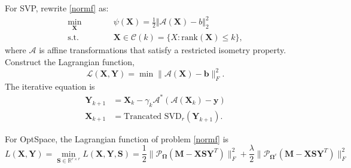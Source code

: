 \documentclass{article}
\begin{document}
{For SVP, rewrite \eqref{normf} as:
\begin{equation}
    \begin{aligned}
        \min_{\mathbf X}\qquad&\quad \psi (\mathbf X) = \frac{1}{2}\Vert \mathcal{A}(\mathbf X) - b\Vert_2^2\\
        \text{s.t.}\qquad&\quad\mathbf X \in \mathcal{C}(k) = \{X \colon \text{rank}(\mathbf X) \leq k\},
    \end{aligned}
\end{equation}
where $\mathcal{A}$ is affine transformations that satisfy a restricted isometry property.
Construct the Lagrangian function,
\begin{equation}
    \mathcal{L}(\mathbf X,\mathbf Y) = \min \lVert \mathcal{A}(\mathbf X) -\mathbf b \rVert_F^2.
\end{equation}
The iterative equation is
\begin{equation}
    \begin{aligned}
        \mathbf Y_{k+1} & = \mathbf X_{k} - \gamma_k \mathcal{A}^*(\mathcal{A}(\mathbf X_k)-\mathbf y)\\
        \mathbf X_{k+1} & = \text{Trancated SVD}_r(\mathbf Y_{k+1}).
    \end{aligned}
\end{equation}

For OptSpace, the Lagrangian function of problem \eqref{normf} is
\begin{equation}
    L(\mathbf X,\mathbf Y) = \min_{\mathbf S\in\mathbb R^{r\times r}} L(\mathbf X,\mathbf Y,\mathbf S) = \frac{1}{2}\lVert\mathcal P_{\mathbf\Omega}(\mathbf M-\mathbf X\mathbf S\mathbf Y^T)\rVert^2_F + \frac{\lambda}{2}\lVert\mathcal P_{\mathbf\Omega^c}(\mathbf M-\mathbf X\mathbf S\mathbf Y^T)
\rVert^2_F
\end{equation}



}
\end{document}
